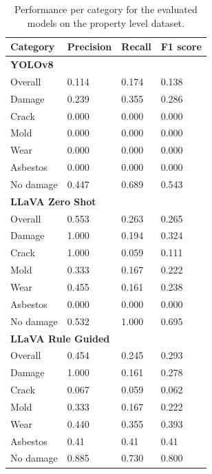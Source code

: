 \begin{table}[H]
\centering
\scriptsize
\renewcommand{\arraystretch}{1.15}
\caption{Performance per category for the evaluated models on the property level dataset.}
\label{tab:category_performance}
\begin{tabular}{p{1.8cm}p{1.4cm}p{1.4cm}p{1.4cm}}
\toprule
Category & Precision & Recall & F1 score \\
\midrule

\multicolumn{4}{l}{\textbf{YOLOv8}}\\
\midrule
Overall & 0.114 & 0.174 & 0.138 \\
Damage & 0.239 & 0.355 & 0.286 \\
Crack & 0.000 & 0.000 & 0.000 \\
Mold & 0.000 & 0.000 & 0.000 \\
Wear & 0.000 & 0.000 & 0.000 \\
Asbestos & 0.000 & 0.000 & 0.000 \\
No damage & 0.447 & 0.689 & 0.543 \\

\midrule
\multicolumn{4}{l}{\textbf{LLaVA Zero Shot}}\\
\midrule
Overall & 0.553 & 0.263 & 0.265 \\
Damage & 1.000 & 0.194 & 0.324 \\
Crack & 1.000 & 0.059 & 0.111 \\
Mold & 0.333 & 0.167 & 0.222 \\
Wear & 0.455 & 0.161 & 0.238 \\
Asbestos & 0.000 & 0.000 & 0.000 \\
No damage & 0.532 & 1.000 & 0.695 \\

\midrule
\multicolumn{4}{l}{\textbf{LLaVA Rule Guided}}\\
\midrule
Overall & 0.454 & 0.245 & 0.293 \\
Damage & 1.000 & 0.161 & 0.278 \\
Crack & 0.067 & 0.059 & 0.062 \\
Mold & 0.333 & 0.167 & 0.222 \\
Wear & 0.440 & 0.355 & 0.393 \\
Asbestos & 0.41 & 0.41 & 0.41 \\
No damage & 0.885 & 0.730 & 0.800 \\

\bottomrule
\end{tabular}
\end{table}
%                                        

